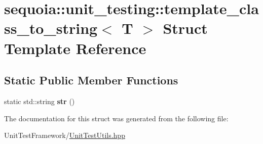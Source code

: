 \hypertarget{structsequoia_1_1unit__testing_1_1template__class__to__string}{}\section{sequoia\+::unit\+\_\+testing\+::template\+\_\+class\+\_\+to\+\_\+string$<$ T $>$ Struct Template Reference}
\label{structsequoia_1_1unit__testing_1_1template__class__to__string}
\subsection*{Static Public Member Functions}
\begin{DoxyCompactItemize}
\item 
\mbox{\label{structsequoia_1_1unit__testing_1_1template__class__to__string_aa33796ddee7697f8373f99b71e03e0cd}} 
static std\+::string {\bfseries str} ()
\end{DoxyCompactItemize}


The documentation for this struct was generated from the following file\+:\begin{DoxyCompactItemize}
\item 
Unit\+Test\+Framework/\mbox{\hyperlink{_unit_test_utils_8hpp}{Unit\+Test\+Utils.\+hpp}}\end{DoxyCompactItemize}
